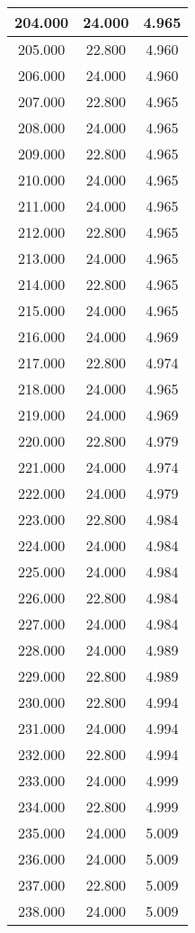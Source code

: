 \documentclass[11pt,a4paper]{jsarticle}
\begin{document}
\begin{center}
\begin{longtable}{|c|c|c|}
204.000	 & 24.000&  4.965 \\ \hline
205.000	 & 22.800&  4.960 \\ \hline
206.000	 & 24.000&  4.960 \\ \hline
207.000	 & 22.800&  4.965 \\ \hline
208.000	 & 24.000&  4.965 \\ \hline
209.000	 & 22.800&  4.965 \\ \hline
210.000	 & 24.000&  4.965 \\ \hline
211.000	 & 24.000&  4.965 \\ \hline
212.000	 & 22.800&  4.965 \\ \hline
213.000	 & 24.000&  4.965 \\ \hline
214.000	 & 22.800&  4.965 \\ \hline
215.000	 & 24.000&  4.965 \\ \hline
216.000	 & 24.000&  4.969 \\ \hline
217.000	 & 22.800&  4.974 \\ \hline
218.000	 & 24.000&  4.965 \\ \hline
219.000	 & 24.000&  4.969 \\ \hline
220.000	 & 22.800&  4.979 \\ \hline
221.000	 & 24.000&  4.974 \\ \hline
222.000	 & 24.000&  4.979 \\ \hline
223.000	 & 22.800&  4.984 \\ \hline
224.000	 & 24.000&  4.984 \\ \hline
225.000	 & 24.000&  4.984 \\ \hline
226.000	 & 22.800&  4.984 \\ \hline
227.000	 & 24.000&  4.984 \\ \hline
228.000	 & 24.000&  4.989 \\ \hline
229.000	 & 22.800&  4.989 \\ \hline
230.000	 & 22.800&  4.994 \\ \hline
231.000	 & 24.000&  4.994 \\ \hline
232.000	 & 22.800&  4.994 \\ \hline
233.000	 & 24.000&  4.999 \\ \hline
234.000	 & 22.800&  4.999 \\ \hline
235.000	 & 24.000&  5.009 \\ \hline
236.000	 & 24.000&  5.009 \\ \hline
237.000	 & 22.800&  5.009 \\ \hline
238.000	 & 24.000&  5.009 \\ \hline

\end{longtable}
\end{center}
\end{document}

